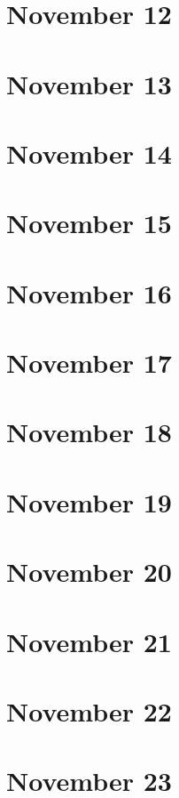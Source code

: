 \section{November 12}

\section{November 13}

\section{November 14}

\section{November 15}

\section{November 16}

\section{November 17}

\section{November 18}

\section{November 19}

\section{November 20}

\section{November 21}

\section{November 22}

\section{November 23}

